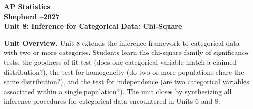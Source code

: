 \documentclass[10pt]{article}
\begin{document}
\vspace{-1.3in}

\begin{center}
  {\color{white}\bfseries\fontsize{24}{30}\selectfont AP Statistics}\\[5pt]
  {\color{goldacc}\bfseries\large Shepherd --2027}\\[10pt]
  {\color{white}\bfseries\Large Unit 8: Inference for Categorical Data: Chi-Square}\\[3pt]
\end{center}

\vspace{0.18in}

\begin{tcolorbox}[colback=sky,colframe=navy,boxrule=0.9pt,arc=2mm,
    left=4mm,right=4mm,top=2mm,bottom=2mm]
  \small\textbf{Unit Overview.}\quad
  Unit 8 extends the inference framework to categorical data with two or more categories.
  Students learn the chi-square family of significance tests: the goodness-of-fit test
  (does one categorical variable match a claimed distribution?), the test for homogeneity
  (do two or more populations share the same distribution?), and the test for independence
  (are two categorical variables associated within a single population?). The unit closes
  by synthesizing all inference procedures for categorical data encountered in Units 6
  and 8.
\end{tcolorbox}

\vspace{0.14in}
\end{document}
